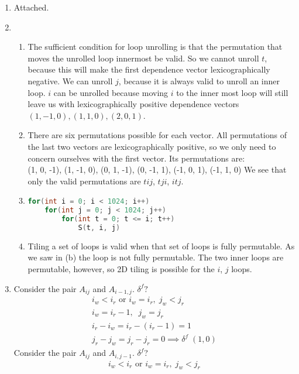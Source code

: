 \documentclass[11pt]{article}
\begin{document}
\begin{enumerate}
\item Attached.
\item
\begin{enumerate}
\item  The sufficient condition for loop unrolling is that the permutation that moves the unrolled loop innermost be valid. So we cannot unroll $t$, because this will make the first dependence vector lexicographically negative. We can unroll $j$, because it is always valid to unroll an inner loop. $i$ can be unrolled because moving $i$ to the inner most loop will still leave us with lexicographically positive dependence vectors $(1, -1, 0), (1, 1, 0), (2, 0, 1)$.
\item There are six permutations possible for each vector. All permutations of the last two vectors are lexicographically positive, so we only need to concern ourselves with the first vector. Its permutations are:\\
(1, 0, -1), (1, -1, 0), (0, 1, -1), (0, -1, 1), (-1, 0, 1), (-1, 1, 0)
We see that only the valid permutations are $tij$, $tji$, $itj$. 
\item 
\begin{lstlisting}[language=C++,
                   directivestyle={\color{green}}
                   emph={int,char,double,float,unsigned},
                   emphstyle={\color{green}}
                  ]
for(int i = 0; i < 1024; i++)
	for(int j = 0; j < 1024; j++)
		for(int t = 0; t <= i; t++)    
			S(t, i, j)           
\end{lstlisting}
\item Tiling a set of loops is valid when that set of loops is fully permutable. As we saw in (b) the loop is not fully permutable. The two inner loops are permutable, however, so 2D tiling is possible for the $i$, $j$ loops.
\end{enumerate}
\item 
Consider the pair $A_{ij}$ and $A_{i-1,j}$. $\delta^f?$ 
\begin{gather*}
i_w < i_r \textrm{ or } i_w = i_r, \; j_w < j_r\\
i_w = i_r - 1, \;\; j_w = j_r\\
i_r - i_w = i_r - (i_r - 1) = 1\\
j_r - j_w = j_r - j_r = 0 \implies \delta^f \; (1,0)
\end{gather*}
Consider the pair $A_{ij}$ and $A_{i, j-1}$. $\delta^f$?
\begin{gather*}
i_w < i_r \textrm{ or } i_w = i_r, \; j_w < j_r\\

\end{gather*}
\end{enumerate}
\end{document}
